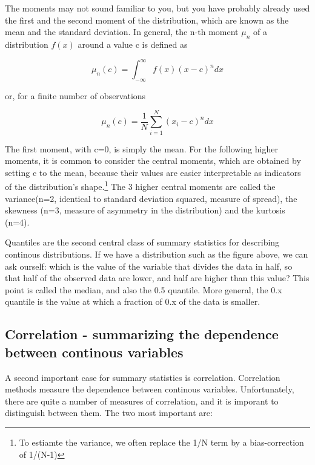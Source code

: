 \documentclass[a4paper,twoside]{tufte-book}\usepackage[]{graphicx}\usepackage[]{color}
\begin{document}
The moments may not sound familiar to you, but you have probably already used the first and the second moment of the distribution, which are known as the mean and the standard deviation. In general, the n-th moment $\mu_n$ of a distribution $f(x)$ around a value c is defined as 

\begin{equation}
\mu_n(c) = \int_{-\infty}^{\infty} f(x) (x - c)^n dx
\end{equation}

or, for a finite number of observations 

\begin{equation}
\mu_n(c) = \frac{1}{N}\sum_{i=1}^N (x_i - c)^n dx
\end{equation}

The first moment, with c=0, is simply the mean. For the following higher moments, it is common to consider the central moments, which are obtained by setting c to the mean, because their values are easier interpretable as indicators of the distribution's shape.\footnote{To estiamte the variance, we often replace the 1/N term by a bias-correction of 1/(N-1)} The 3 higher central moments are called the variance(n=2, identical to standard deviation squared, measure of spread), the skewness (n=3, measure of asymmetry in the distribution) and the kurtosis (n=4). 

Quantiles are the second central class of summary statistics for describing continous distributions. If we have a distribution such as the figure above, we can ask ourself: which is the value of the variable that divides the data in half, so that half of the observed data are lower, and half are higher than this value? This point is called the median, and also the 0.5 quantile. More general, the 0.x quantile is the value at which a fraction of 0.x of the data is smaller. 

\subsection{Correlation - summarizing the dependence between continous variables}

A second important case for summary statistics is correlation. Correlation methods measure the dependence between continous variables. Unfortunately, there are quite a number of measures of correlation, and it is imporant to distinguish between them. The two most important are:
\end{document}
